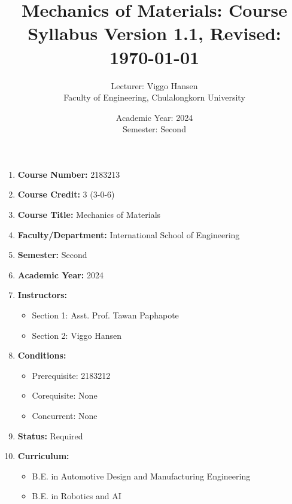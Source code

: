 \documentclass[12pt]{article}
\title{\textbf{Mechanics of Materials: Course Syllabus} \newline \small{Version 1.1, Revised: \today}}
\author{Lecturer: Viggo Hansen\\
Faculty of Engineering, Chulalongkorn University}
\date{Academic Year: 2024 \\ Semester: Second}
\begin{document}
\maketitle

{
\hypersetup{linkcolor=black} %
\tableofcontents
}

\newcommand{\documentversion}{Version 1.1}
\newcommand{\documentdate}{\today}

\pagestyle{fancy}
\fancyhf{}
\fancyhead[L]{\documentversion}
\fancyhead[R]{\documentdate}
\renewcommand{\headrulewidth}{0.4pt}
\renewcommand{\footrulewidth}{0.4pt}

\begin{enumerate}
    \item \textbf{Course Number:} 2183213
    \item \textbf{Course Credit:} 3 (3-0-6)
    \item \textbf{Course Title:} Mechanics of Materials
    \item \textbf{Faculty/Department:} International School of Engineering
    \item \textbf{Semester:} Second
    \item \textbf{Academic Year:} 2024
    \item \textbf{Instructors:}
        \begin{itemize}
            \item Section 1: Asst. Prof. Tawan Paphapote
            \item Section 2: Viggo Hansen
        \end{itemize}
    \item \textbf{Conditions:}
        \begin{itemize}
            \item Prerequisite: 2183212
            \item Corequisite: None
            \item Concurrent: None
        \end{itemize}
    \item \textbf{Status:} Required
    \item \textbf{Curriculum:}
        \begin{itemize}
            \item B.E. in Automotive Design and Manufacturing Engineering
            \item B.E. in Robotics and AI

\end{itemize}
\end{enumerate}
\end{document}
